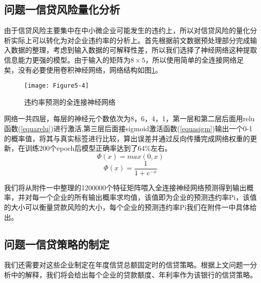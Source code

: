 \documentclass{cumcmthesis}
\begin{document}
\subsection{问题一信贷风险量化分析}
由于信贷风险主要集中在中小微企业可能发生的违约上，所以对信贷风险的量化分析实际上可以转化为对企业违约率的分析上。首先根据前文数据预处理部分完成输入数据的整理，考虑到输入数据的可解释性差，所以我们选择了神经网络这种提取信息能力更强的模型。由于输入的矩阵为$8 \times 5$，所以使用简单的全连接网络足矣，没有必要使用卷积神经网络，网络结构如图\ref{fig54}。

\begin{figure}[H]
    \centering
    \texttt{[image: Figure5-4]}
    \caption{违约率预测的全连接神经网络}
    \label{fig54}
\end{figure}

网络一共四层，每层的神经元个数依次为8，6，4，1，第一层和第二层后面用relu函数\cite{ref3}(\ref{equarelu})进行激活,第三层后面接sigmoid激活函数(\ref{equasigm})输出一个0-1的概率值，将其与真实标签进行比较，算出误差并通过反向传播完成网络权重的更新，在训练200个epoch后模型正确率达到了64\%左右。
\begin{equation}
    \Phi(x) = max(0,x)
    \label{equarelu}
\end{equation}
\begin{equation}
    \Phi(x) = \frac{1}{1+e^{-x}}
    \label{equasigm}
\end{equation}

我们将从附件一中整理的1200000个特征矩阵喂入全连接神经网络预测得到输出概率，并对每一个企业的所有输出概率求均值，该值即为企业的预测违约率Pi，该值的大小可以衡量贷款风险的大小，每个企业的预测违约率Pi我们在附件一中具体给出。

\subsection{问题一信贷策略的制定}
我们还需要对这些企业制定在年度信贷总额固定时的信贷策略。根据上文问题一分析中的解释，我们将会给出每个企业的贷款额度、年利率作为该银行的信贷策略。
\end{document}
